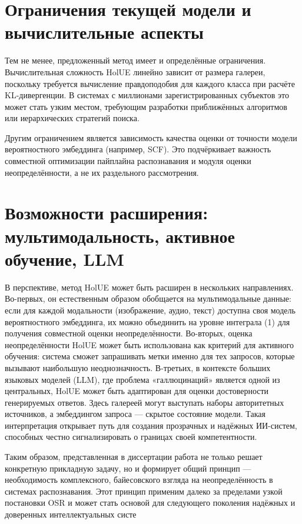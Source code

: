 \section{Ограничения текущей модели и вычислительные аспекты}\label{sec:generalization/limitations}
Тем не менее, предложенный метод имеет и определённые ограничения.
Вычислительная сложность HolUE линейно зависит от размера галереи, поскольку требуется вычисление правдоподобия для каждого класса при расчёте KL-дивергенции.
В системах с миллионами зарегистрированных субъектов это может стать узким местом, требующим разработки приближённых алгоритмов или иерархических стратегий поиска.

Другим ограничением является зависимость качества оценки от точности модели вероятностного эмбеддинга (например, SCF).
Это подчёркивает важность совместной оптимизации пайплайна распознавания и модуля оценки неопределённости, а не их раздельного рассмотрения.
\section{Возможности расширения: мультимодальность, активное обучение, LLM}\label{sec:generalization/future_work}
В перспективе, метод HolUE может быть расширен в нескольких направлениях.
Во-первых, он естественным образом обобщается на мультимодальные данные: если для каждой модальности (изображение, аудио, текст) доступна своя модель вероятностного эмбеддинга, их можно объединить на уровне интеграла (1) для получения совместной оценки неопределённости.
Во-вторых, оценка неопределённости HolUE может быть использована как критерий для активного обучения: система сможет запрашивать метки именно для тех запросов, которые вызывают наибольшую неоднозначность.
В-третьих, в контексте больших языковых моделей (LLM), где проблема «галлюцинаций» является одной из центральных, HolUE может быть адаптирован для оценки достоверности генерируемых ответов.
Здесь галереей могут выступать наборы авторитетных источников, а эмбеддингом запроса — скрытое состояние модели.
Такая интерпретация открывает путь для создания прозрачных и надёжных ИИ-систем, способных честно сигнализировать о границах своей компетентности.

Таким образом, представленная в диссертации работа не только решает конкретную прикладную задачу, но и формирует общий принцип — необходимость комплексного, байесовского взгляда на неопределённость в системах распознавания.
Этот принцип применим далеко за пределами узкой постановки OSR и может стать основой для следующего поколения надёжных и доверенных интеллектуальных систе

